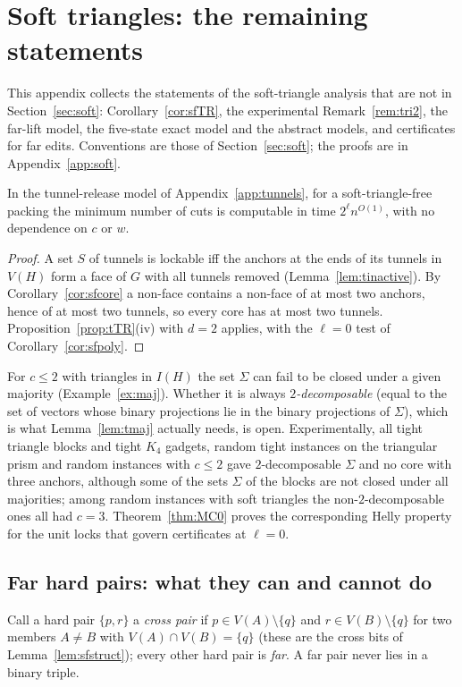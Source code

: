 \section{Soft triangles: the remaining statements}\label{app:softfull}
This appendix collects the statements of the soft-triangle analysis that are not in Section~\ref{sec:soft}: Corollary~\ref{cor:sfTR}, the experimental Remark~\ref{rem:tri2}, the far-lift model, the five-state exact model and the abstract models, and certificates for far edits. Conventions are those of Section~\ref{sec:soft}; the proofs are in Appendix~\ref{app:soft}.
\begin{corollary}\label{cor:sfTR}
In the tunnel-release model of Appendix~\ref{app:tunnels}, for a soft-triangle-free packing the minimum number of cuts is computable in time $2^{\ell}n^{O(1)}$, with no dependence on $c$ or $w$.
\end{corollary}
\begin{proof}
A set $S$ of tunnels is lockable iff the anchors at the ends of its tunnels in $V(H)$ form a face of $G$ with all tunnels removed (Lemma~\ref{lem:tinactive}). By Corollary~\ref{cor:sfcore} a non-face contains a non-face of at most two anchors, hence of at most two tunnels, so every core has at most two tunnels. Proposition~\ref{prop:tTR}(iv) with $d=2$ applies, with the $\ell=0$ test of Corollary~\ref{cor:sfpoly}.
\end{proof}

\begin{remark}\label{rem:tri2}
For $c\le2$ with triangles in $I(H)$ the set $\Sigma$ can fail to be closed under a given majority (Example~\ref{ex:maj}). Whether it is always \emph{$2$-decomposable} (equal to the set of vectors whose binary projections lie in the binary projections of $\Sigma$), which is what Lemma~\ref{lem:tmaj} actually needs, is open. Experimentally, all tight triangle blocks and tight $K_4$ gadgets, random tight instances on the triangular prism and random instances with $c\le2$ gave $2$-decomposable $\Sigma$ and no core with three anchors, although some of the sets $\Sigma$ of the blocks are not closed under all majorities; among random instances with soft triangles the non-$2$-decomposable ones all had $c=3$. Theorem~\ref{thm:MC0} proves the corresponding Helly property for the unit locks that govern certificates at $\ell=0$.
\end{remark}
\subsection{Far hard pairs: what they can and cannot do}\label{sec:softfar}
Call a hard pair $\{p,r\}$ a \emph{cross pair} if $p\in V(A)\setminus\{q\}$ and $r\in V(B)\setminus\{q\}$ for two members $A\ne B$ with $V(A)\cap V(B)=\{q\}$ (these are the cross bits of Lemma~\ref{lem:sfstruct}); every other hard pair is \emph{far}. A far pair never lies in a binary triple.

